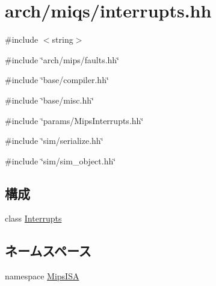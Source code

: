 \hypertarget{miqs_2interrupts_8hh}{
\section{arch/miqs/interrupts.hh}
\label{miqs_2interrupts_8hh}
}
{\ttfamily \#include $<$string$>$}\par
{\ttfamily \#include \char`\"{}arch/mips/faults.hh\char`\"{}}\par
{\ttfamily \#include \char`\"{}base/compiler.hh\char`\"{}}\par
{\ttfamily \#include \char`\"{}base/misc.hh\char`\"{}}\par
{\ttfamily \#include \char`\"{}params/MipsInterrupts.hh\char`\"{}}\par
{\ttfamily \#include \char`\"{}sim/serialize.hh\char`\"{}}\par
{\ttfamily \#include \char`\"{}sim/sim\_\-object.hh\char`\"{}}\par
\subsection*{構成}
\begin{DoxyCompactItemize}
\item 
class \hyperlink{classMipsISA_1_1Interrupts}{Interrupts}
\end{DoxyCompactItemize}
\subsection*{ネームスペース}
\begin{DoxyCompactItemize}
\item 
namespace \hyperlink{namespaceMipsISA}{MipsISA}
\end{DoxyCompactItemize}
